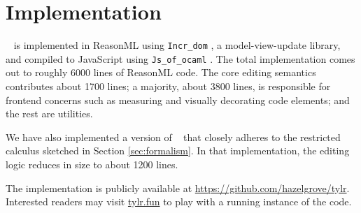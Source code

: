 \section{Implementation}\label{sec:implementation}

\tylr~ is implemented in ReasonML using \texttt{Incr\_dom} \cite{incr-dom},
a model-view-update library, and compiled to JavaScript using
\texttt{Js\_of\_ocaml} \cite{DBLP:conf/aplas/RadanneVB16}.
The total implementation comes out to roughly 6000 lines
of ReasonML code.
The core editing semantics contributes about 1700 lines;
a majority, about 3800 lines, is responsible for frontend
concerns such as measuring and visually decorating code
elements; and the rest are utilities.

We have also implemented a version of \tylr~ that closely adheres
to the restricted calculus sketched in Section \ref{sec:formalism}.
In that implementation, the editing logic reduces in size to
about 1200 lines.

The implementation is publicly available at
\url{https://github.com/hazelgrove/tylr}.
Interested readers may visit \url{tylr.fun} to play with a
running instance of the code.





